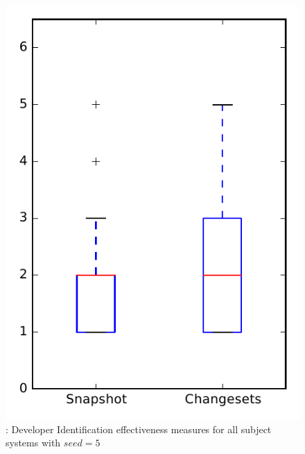 
\begin{figure}
\centering
\includegraphics[height=0.4\textheight]{figures/dit_seed/rq1_overview_5}
\caption{\rtwo: Developer Identification effectiveness measures for all subject systems with $seed=5$}
\label{fig:dit_seed:rq1:overview}
\end{figure}
